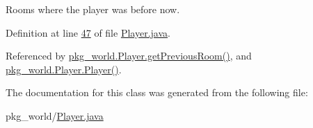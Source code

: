 Rooms where the player was before now. 



Definition at line \hyperlink{Player_8java_source_l00047}{47} of file \hyperlink{Player_8java_source}{Player.\-java}.



Referenced by \hyperlink{Player_8java_source_l00111}{pkg\-\_\-world.\-Player.\-get\-Previous\-Room()}, and \hyperlink{Player_8java_source_l00059}{pkg\-\_\-world.\-Player.\-Player()}.



The documentation for this class was generated from the following file\-:\begin{DoxyCompactItemize}
\item 
pkg\-\_\-world/\hyperlink{Player_8java}{Player.\-java}\end{DoxyCompactItemize}
